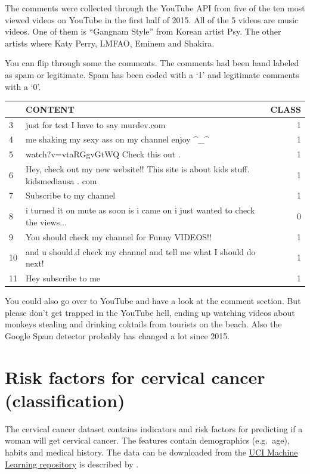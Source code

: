 \documentclass[12pt,]{krantz}
\theoremstyle{definition}
\theoremstyle{definition}
\theoremstyle{definition}
\theoremstyle{remark}
\begin{document}
The comments were collected through the YouTube API from five of the ten
most viewed videos on YouTube in the first half of 2015. All of the 5
videos are music videos. One of them is ``Gangnam Style'' from Korean
artist Psy. The other artists where Katy Perry, LMFAO, Eminem and
Shakira.

You can flip through some the comments. The comments had been hand
labeled as spam or legitimate. Spam has been coded with a `1' and
legitimate comments with a `0'.

\begin{tabular}{l|l|r}
\hline
  & CONTENT & CLASS\\
\hline
3 & just for test I have to say murdev.com & 1\\
\hline
4 & me shaking my sexy ass on my channel enjoy \textasciicircum{}\_\textasciicircum{} & 1\\
\hline
5 & watch?v=vtaRGgvGtWQ   Check this out . & 1\\
\hline
6 & Hey, check out my new website!! This site is about kids stuff. kidsmediausa  . com & 1\\
\hline
7 & Subscribe to my channel & 1\\
\hline
8 & i turned it on mute as soon is i came on i just wanted to check the  views... & 0\\
\hline
9 & You should check my channel for Funny VIDEOS!! & 1\\
\hline
10 & and u should.d check my channel and tell me what I should do next! & 1\\
\hline
11 & Hey subscribe to me & 1\\
\hline
\end{tabular}

You could also go over to YouTube and have a look at the comment
section. But please don't get trapped in the YouTube hell, ending up
watching videos about monkeys stealing and drinking coktails from
tourists on the beach. Also the Google Spam detector probably has
changed a lot since 2015.

\section{Risk factors for cervical cancer
(classification)}\label{cervical-data}

The cervical cancer dataset contains indicators and risk factors for
predicting if a woman will get cervical cancer. The features contain
demographics (e.g.~age), habits and medical history. The data can be
downloaded from the
\href{https://archive.ics.uci.edu/ml/datasets/Cervical+cancer+\%28Risk+Factors\%29}{UCI
Machine Learning repository} is described by
\citet{fernandes2017transfer}.
\end{document}
